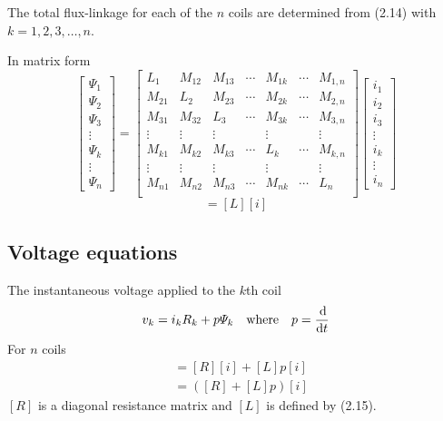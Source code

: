 \documentclass[a4paper,numbers=noenddot,12pt]{scrbook}
\begin{document}
The total flux-linkage for each of the $n$ coils are determined from (2.14) with $k = 1,2,3,\dotsc, n$.

In matrix form
\begin{equation}
    \begin{bmatrix}
        \varPsi_1 \\[1ex] \varPsi_2 \\[1ex] \varPsi_3 \\[1ex] \vdots \\[1ex] \varPsi_k \\[1ex] \vdots \\[1ex] \varPsi_n
    \end{bmatrix}
    =
    \begin{bmatrix}
        L_1 & M_{12} & M_{13} & \cdots & M_{1k} & \cdots & M_{1,n} \\[1ex]
        M_{21} & L_{2} & M_{23} & \cdots & M_{2k} & \cdots & M_{2,n} \\[1ex]
        M_{31} & M_{32} & L_{3} & \cdots & M_{3k} & \cdots & M_{3,n} \\[1ex]
        \vdots & \vdots & \vdots &  &\vdots &  & \vdots \\[1ex]
        M_{k1} & M_{k2} & M_{k3} & \cdots & L_{k} & \cdots & M_{k,n} \\[1ex]
        \vdots & \vdots & \vdots &  &\vdots &  & \vdots \\[1ex]
        M_{n1} & M_{n2} & M_{n3} & \cdots & M_{nk} & \cdots & L_{n} \\
    \end{bmatrix}
    \begin{bmatrix}
        i_1 \\[1ex] i_2 \\[1ex] i_3 \\[1ex] \vdots \\[1ex] i_k \\[1ex] \vdots \\[1ex] i_n
    \end{bmatrix}
    \label{eq:Eq2.15}
\end{equation}
\begin{equation}
    [\varPsi] = [L][i]
    \label{eq:Eq2.16}
\end{equation}

\subsection{Voltage equations}
The instantaneous voltage applied to the $k$th coil
\begin{equation}
    v_k = i_k R_k + p \varPsi_k \quad \text{where} \quad p = \dfrac{\dif}{\dif t}
    \label{eq:Eq2.17}
\end{equation}
For $n$ coils
\begin{align}
    [v] & = [R][i] + [L]p[i] \nonumber \\
    & = ([R] + [L] p)[i]
    \label{eq:Eq2.18}
\end{align}
$[R]$ is a diagonal resistance matrix and $[L]$ is defined by (2.15).
\end{document}
